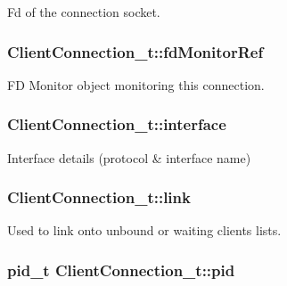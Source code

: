Fd of the connection socket. 

\subsubsection[{\texorpdfstring{fd\+Monitor\+Ref}{fdMonitorRef}}]{ Client\+Connection\+\_\+t\+::fd\+Monitor\+Ref}\hypertarget{struct_client_connection__t_ae609b49ba3964ce22f04bd97ffdbac2d}{}\label{struct_client_connection__t_ae609b49ba3964ce22f04bd97ffdbac2d}


FD Monitor object monitoring this connection. 

\subsubsection[{\texorpdfstring{interface}{interface}}]{ Client\+Connection\+\_\+t\+::interface}\hypertarget{struct_client_connection__t_a8e22e27997e461cce0dc4a51fc2b9fba}{}\label{struct_client_connection__t_a8e22e27997e461cce0dc4a51fc2b9fba}


Interface details (protocol \& interface name) 

\subsubsection[{\texorpdfstring{link}{link}}]{ Client\+Connection\+\_\+t\+::link}\hypertarget{struct_client_connection__t_a1ce06079f1089ee0f63fd8cd490c1996}{}\label{struct_client_connection__t_a1ce06079f1089ee0f63fd8cd490c1996}


Used to link onto unbound or waiting clients lists. 

\subsubsection[{\texorpdfstring{pid}{pid}}]{\setlength{\rightskip}{0pt plus 5cm}pid\+\_\+t Client\+Connection\+\_\+t\+::pid}\hypertarget{struct_client_connection__t_ab644f93f66ef9bb999207d83ebd7c5af}{}\label{struct_client_connection__t_ab644f93f66ef9bb999207d83ebd7c5af}


